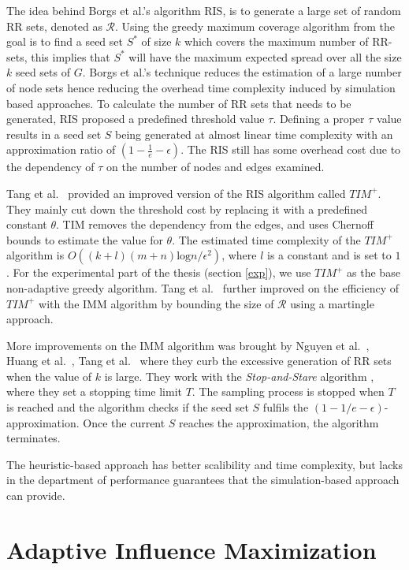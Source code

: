 The idea behind Borgs et al.'s algorithm RIS, is to generate a large set of random RR sets, denoted as $\mathcal{R}$. Using the greedy maximum coverage algorithm from \cite{Vazirani} the goal is to find a seed set $S^*$ of size $k$ which covers the maximum number of RR-sets, this implies that $S^*$ will have the maximum expected spread over all the size $k$ seed sets of $G$. Borgs et al.'s technique reduces the estimation of a large number of node sets hence reducing the overhead time complexity induced by simulation based approaches. To calculate the number of RR sets that needs to be generated, RIS proposed a predefined threshold value $\tau$. Defining a proper $\tau$ value results in a seed set $S$ being generated at almost linear time complexity with an approximation ratio of $(1-\frac{1}{e}-\epsilon)$. The RIS still has some overhead cost due to the dependency of $\tau$ on the number of nodes and edges examined.

Tang et al.~\cite{Tang2014} provided an improved version of the RIS algorithm called $TIM^+$. They mainly cut down the threshold cost by replacing it with a predefined constant $\theta$. TIM removes the dependency from the edges, and uses Chernoff bounds to estimate the value for $\theta$. The estimated time complexity of the $TIM^+$ algorithm is $O((k+l)(m+n)\text{log} n/\epsilon^2)$, where $l$ is a constant and is set to $1$. For the experimental part of the thesis (section \ref{exp}), we use $TIM^+$ as the base non-adaptive greedy algorithm.
Tang et al.~\cite{Tang15} further improved on the efficiency of $TIM^+$ with the IMM algorithm by bounding the size of $\mathcal{R}$ using a martingle approach.

More improvements on the IMM algorithm was brought by Nguyen et al.~\cite{Nguyen16}, Huang et al.~\cite{Huang}, Tang et al.~\cite{Tang2019} where they curb the excessive generation of RR sets when the value of $k$ is large. They work with the \textit{Stop-and-Stare} algorithm \cite{Nguyen16}, where they set a stopping time limit $T$. The sampling process is stopped when $T$ is reached and the algorithm checks if the seed set $S$ fulfils the $(1-1/e-\epsilon)$-approximation. Once the current $S$ reaches the approximation, the algorithm terminates. 


The heuristic-based approach has better scalibility and time complexity, but lacks in the department of performance guarantees that the simulation-based approach can provide.

 


\section{Adaptive Influence Maximization} \label{sec:aim}


